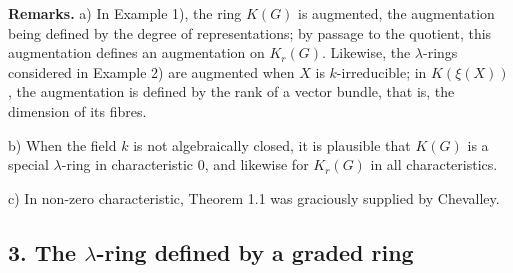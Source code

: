 \textbf{Remarks.} a) In Example 1), the ring $K(G)$ is augmented, the augmentation being defined by the degree of representations; by passage to the quotient, this augmentation defines an augmentation on $K_r(G)$. Likewise, the $\lambda$-rings considered in Example 2) are augmented when $X$ is $k$-irreducible; in $K(\xi(X))$, the augmentation is defined by the rank of a vector bundle, that is, the dimension of its fibres.

b) When the field $k$ is not algebraically closed, it is plausible that $K(G)$ is a special $\lambda$-ring in characteristic $0$, and likewise for $K_r(G)$ in all characteristics.

c) In non-zero characteristic, Theorem 1.1 was graciously supplied by Chevalley.

\subsection*{3. The $\lambda$-ring defined by a graded ring}

